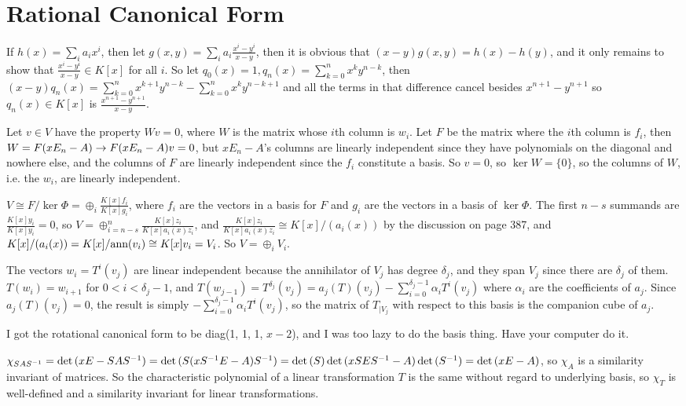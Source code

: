 \documentclass[11pt, oneside]{article}   	%
\begin{document}
\section{Rational Canonical Form}
\be
\item If $h(x) = \sum_ia_ix^i$, then let $g(x, y) = \sum_ia_i\frac{x^i - y^i}{x-y}$, then it is obvious that $(x - y)g(x, y) = h(x) - h(y)$, and it only remains to show that $\frac{x^i - y^i}{x-y} \in K[x]$ for all $i$. So let $q_0(x) = 1, q_n(x) = \sum_{k=0}^nx^ky^{n-k}$, then $(x-y)q_n(x) = \sum_{k=0}^nx^{k+1}y^{n-k} - \sum_{k=0}^nx^ky^{n-k+1}$ and all the terms in that difference cancel besides $x^{n+1} - y^{n+1}$ so $q_n(x) \in K[x]$ is $\frac{x^{n+1} - y^{n+1}}{x-y}$. 
\item Let $v \in V$ have the property $Wv = 0$, where $W$ is the matrix whose $i$th column is $w_i$. Let $F$ be the matrix where the $i$th column is $f_i$, then $W = F(xE_n - A) \rightarrow F(xE_n-A)v = 0$, but $xE_n - A$'s columns are linearly independent since they have polynomials on the diagonal and nowhere else, and the columns of $F$ are linearly independent since the $f_i$ constitute a basis. So $v=0$, so $\ker{W} = \{0\}$, so the columns of $W$, i.e. the $w_i$, are linearly independent.
\item \be
\item $V \cong F/\ker{\Phi} = \oplus_i\frac{K[x]f_i}{K[x]g_i}$, where $f_i$ are the vectors in a basis for $F$ and $g_i$ are the vectors in a basis of $\ker{\Phi}$. The first $n-s$ summands are $\frac{K[x]y_i}{K[x]y_i} = 0$, so $V = \oplus_{i=n-s}^n\frac{K[x]z_i}{K[x]a_i(x)z_i}$, and $\frac{K[x]z_i}{K[x]a_i(x)z_i} \cong K[x] / (a_i(x))$ by the discussion on page 387, and $K[x] / (a_i(x)) = K[x] / \text{ann}(v_i) \cong K[x]v_i = V_i$. So $V = \oplus_i V_i$.
\item The vectors $w_i = T^i(v_j)$ are linear independent because the annihilator of $V_j$ has degree $\delta_j$, and they span $V_j$ since there are $\delta_j$ of them. $T(w_i) = w_{i+1}$ for $0 < i < \delta_j-1$, and $T(w_{j-1}) = T^{\delta_j}(v_j) = a_j(T)(v_j) - \sum_{i=0}^{\delta_j-1}\alpha_iT^i(v_j)$ where $\alpha_i$ are the coefficients of $a_j$. Since $a_j(T)(v_j) = 0$, the result is simply $-\sum_{i=0}^{\delta_j-1}\alpha_iT^i(v_j)$, so the matrix of $T_{|V_j}$ with respect to this basis is the companion cube of $a_j$.
\ee
\item I got the rotational canonical form to be diag(1, 1, 1, $x-2$), and I was too lazy to do the basis thing. Have your computer do it.
\item $\chi_{SAS^{-1}} = \det{(xE - SAS^{-1})} = \det{(S(xS^{-1}E - A)S^{-1})} = \det{(S)}\det{(xSES^{-1}-A)}\det{(S^{-1})} = \det{(xE-A)}$, so $\chi_A$ is a similarity invariant of matrices. So the characteristic polynomial of a linear transformation $T$ is the same without regard to underlying basis, so $\chi_T$ is well-defined and a similarity invariant for linear transformations.
\end{document}
